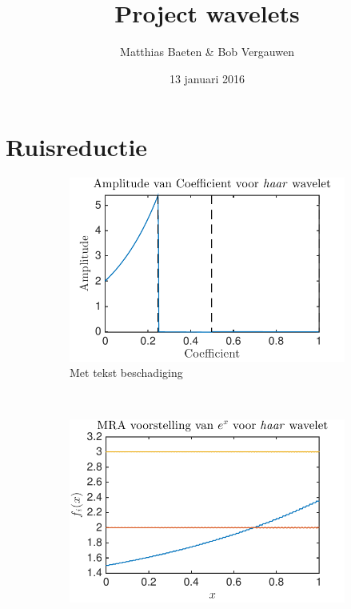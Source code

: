 

\title{Project wavelets}
\author{Matthias Baeten \& Bob Vergauwen}
\date{ 13 januari 2016}



\maketitle

\section{Ruisreductie}






\begin{figure}
    \centering
    \begin{subfigure}[b]{0.45\textwidth}
        \includegraphics[width=\textwidth]{../src/denoising/haar_noNoise/coef_exp_haar_2}
        \caption{Met tekst beschadiging}
        \label{fig:tiger}
    \end{subfigure}
    ~ %
    \begin{subfigure}[b]{0.45\textwidth}
        \includegraphics[width=\textwidth]{../src/denoising/haar_noNoise/MRA_exp_haar_2}

\end{subfigure}
\end{figure}

